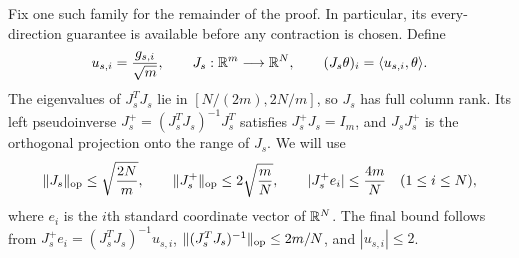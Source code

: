 Fix one such family for the remainder of the proof. In particular, its
every-direction guarantee is available before any contraction is chosen.
Define
\begin{equation}\label{dir:chart-maps}
 u_{s,i}=\frac{g_{s,i}}{\sqrt m},
 \qquad
 J_s:\mathbb R^m\longrightarrow\mathbb R^N,
 \qquad
 (J_s\theta)_i=\langle u_{s,i},\theta\rangle.
\end{equation}
The eigenvalues of $J_s^TJ_s$ lie in $[N/(2m),2N/m]$, so $J_s$ has full
column rank.  Its left pseudoinverse
$J_s^+=(J_s^TJ_s)^{-1}J_s^T$ satisfies $J_s^+J_s=I_m$, and $J_sJ_s^+$ is the
orthogonal projection onto the range of $J_s$.  We will use
\begin{equation}\label{eq:pseudoinverse}
 \|J_s\|_{\mathrm{op}}\le\sqrt{\frac{2N}{m}},
 \qquad
 \|J_s^+\|_{\mathrm{op}}\le2\sqrt{\frac mN},
 \qquad
 |J_s^+e_i|\le\frac{4m}{N}\quad(1\le i\le N),
\end{equation}
where $e_i$ is the $i$th standard coordinate vector of $\mathbb R^N$.  The final
bound follows from $J_s^+e_i=(J_s^TJ_s)^{-1}u_{s,i}$,
$\|(J_s^TJ_s)^{-1}\|_{\mathrm{op}}\le2m/N$, and $|u_{s,i}|\le2$.

